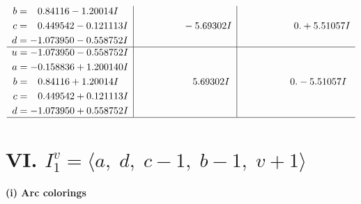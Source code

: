 \documentclass[1p]{elsarticle_modified}
\theoremstyle{definition}
\begin{document}
$$\begin{array}{c|c|c}
\begin{aligned}
b &= \phantom{-}0.84116 - 1.20014 I \\
c &= \phantom{-}0.449542 - 0.121113 I \\
d &= -1.073950 - 0.558752 I\end{aligned}
 & \phantom{-0.000000 } -5.69302 I & \phantom{-0.000000 -}0. + 5.51057 I \\ \hline\begin{aligned}
u &= -1.073950 - 0.558752 I \\
a &= -0.158836 + 1.200140 I \\
b &= \phantom{-}0.84116 + 1.20014 I \\
c &= \phantom{-}0.449542 + 0.121113 I \\
d &= -1.073950 + 0.558752 I\end{aligned}
 & \phantom{-0.000000 -}5.69302 I & \phantom{-0.000000 } 0. - 5.51057 I\\
 \hline 
 \end{array}$$\newpage\newpage\renewcommand{\arraystretch}{1}
\centering \section*{VI. $I^v_{1}= \langle a,\;d,\;c-1,\;b-1,\;v+1 \rangle$}
\flushleft \textbf{(i) Arc colorings}\\
\end{document}
